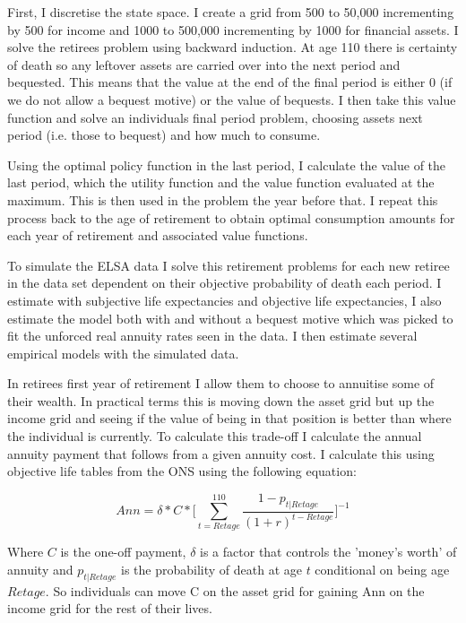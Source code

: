 \documentclass[12pt]{article}
\begin{document}
First, I discretise the state space. I create a grid from 500 to 50,000 incrementing by 500 for income and 1000 to
500,000 incrementing by 1000 for financial assets. I solve the retirees problem using backward induction. At age 110 there is certainty of death so any leftover assets
are carried over into the next period and bequested. This means that the value at the end of the final period is
either 0 (if we do not allow a bequest motive) or the value of bequests. I then take this value function and solve
an individuals final period problem, choosing assets next period (i.e. those to bequest) and how much to consume.

Using the optimal policy function in the last period, I calculate the value of the last period, which the utility
function and the value function evaluated at the maximum. This is then used in the problem the year before that.
I repeat this process back to the age of retirement to obtain optimal consumption amounts for each year of retirement
and associated value functions.

To simulate the ELSA data I solve this retirement problems for each new retiree in the data set dependent on their
objective probability of death each period. I estimate with subjective life expectancies and objective life expectancies,
I also estimate the model both with and without a bequest motive which was picked to fit the unforced real annuity
rates seen in the data. I then estimate several empirical models with the simulated data.

In retirees first year of retirement I allow them to choose to annuitise some of their wealth. In practical terms
this is moving down the asset grid but up the income grid and seeing if the value of being in that position is better
than where the individual is currently. To calculate this trade-off I calculate the annual annuity payment that follows
from a given annuity cost. I calculate this using objective life tables from the ONS using the following equation:

\begin{equation*}
  Ann = \delta * C * \biggl[\sum_{t = Retage}^{110}\frac{1 - p_{t|Retage}}{(1 + r)^{t - Retage}}\biggr]^{-1}
\end{equation*}

Where $C$ is the one-off payment, $\delta$ is a factor that controls the 'money's worth' of annuity and $p_{t|Retage}$
is the probability of death at age $t$ conditional on being age $Retage$. So individuals can move C on the asset grid
for gaining Ann on the income grid for the rest of their lives.
\end{document}

